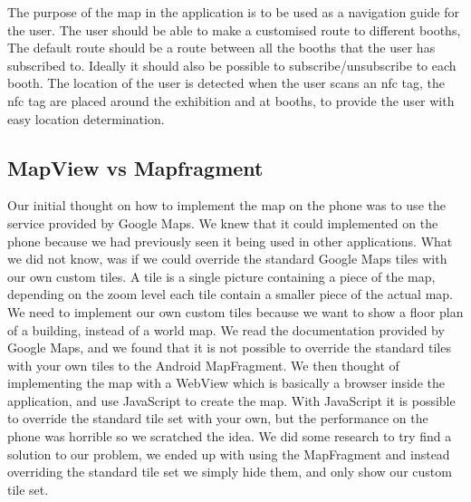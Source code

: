 The purpose of the map in the application is to be used as a navigation guide for the user. The user should be able to make a customised route to different booths, The default route should be a route between all the booths that the user has subscribed to.
Ideally it should also be possible to subscribe/unsubscribe to each booth. The location of the user is detected when the user scans an \ac{nfc} tag, the \ac{nfc} tag are placed around the exhibition and at booths, to provide the user with easy location determination.

\subsection*{MapView vs Mapfragment}
Our initial thought on how to implement the map on the phone was to use the service provided by Google Maps. We knew that it could implemented on the phone because we had previously seen it being used in other applications. What we did not know, was if we could override the standard Google Maps tiles with our own custom tiles. A tile is a single picture containing a piece of the map, depending on the zoom level each tile contain a smaller piece of the actual map.\\
We need to implement our own custom tiles because we want to show a floor plan of a building, instead of a world map. We read the documentation provided by Google Maps, and we found that it is not possible to override the standard tiles with your own tiles to the Android MapFragment. We then thought of implementing the map with a WebView which is basically a browser inside the application, and use JavaScript to create the map. With JavaScript it is possible to override the standard tile set with your own, but the performance on the phone was horrible so we scratched the idea.
We did some research to try find a solution to our problem, we ended up with using the MapFragment and instead overriding the standard tile set we simply hide them, and only show our custom tile set.

